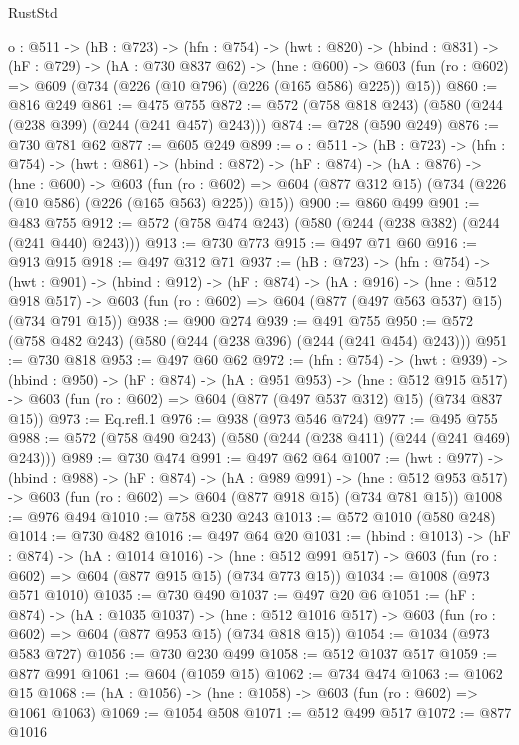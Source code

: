 \begin{lexlean}{RustStd}
\begin{coremodule}
  {o : @511} ->
  (hB : @723) ->
  (hfn : @754) ->
  (hwt : @820) ->
  (hbind : @831) ->
  (hF : @729) ->
  (hA : @730 @837 @62) ->
  (hne : @600) ->
  @603 (fun (ro : @602) => @609 (@734 (@226 (@10 @796) (@226 (@165 @586) @225)) @15))
@860 := @816 @249
@861 := @475 @755
@872 := @572 (@758 @818 @243) (@580 (@244 (@238 @399) (@244 (@241 @457) @243)))
@874 := @728 (@590 @249)
@876 := @730 @781 @62
@877 := @605 @249
@899 := {o : @511} ->
  (hB : @723) ->
  (hfn : @754) ->
  (hwt : @861) ->
  (hbind : @872) ->
  (hF : @874) ->
  (hA : @876) ->
  (hne : @600) ->
  @603
    (fun (ro : @602) => @604 (@877 @312 @15) (@734 (@226 (@10 @586) (@226 (@165 @563) @225)) @15))
@900 := @860 @499
@901 := @483 @755
@912 := @572 (@758 @474 @243) (@580 (@244 (@238 @382) (@244 (@241 @440) @243)))
@913 := @730 @773
@915 := @497 @71 @60
@916 := @913 @915
@918 := @497 @312 @71
@937 := (hB : @723) ->
  (hfn : @754) ->
  (hwt : @901) ->
  (hbind : @912) ->
  (hF : @874) ->
  (hA : @916) ->
  (hne : @512 @918 @517) ->
  @603 (fun (ro : @602) => @604 (@877 (@497 @563 @537) @15) (@734 @791 @15))
@938 := @900 @274
@939 := @491 @755
@950 := @572 (@758 @482 @243) (@580 (@244 (@238 @396) (@244 (@241 @454) @243)))
@951 := @730 @818
@953 := @497 @60 @62
@972 := (hfn : @754) ->
  (hwt : @939) ->
  (hbind : @950) ->
  (hF : @874) ->
  (hA : @951 @953) ->
  (hne : @512 @915 @517) ->
  @603 (fun (ro : @602) => @604 (@877 (@497 @537 @312) @15) (@734 @837 @15))
@973 := Eq.refl.{1}
@976 := @938 (@973 @546 @724)
@977 := @495 @755
@988 := @572 (@758 @490 @243) (@580 (@244 (@238 @411) (@244 (@241 @469) @243)))
@989 := @730 @474
@991 := @497 @62 @64
@1007 := (hwt : @977) ->
  (hbind : @988) ->
  (hF : @874) ->
  (hA : @989 @991) ->
  (hne : @512 @953 @517) -> @603 (fun (ro : @602) => @604 (@877 @918 @15) (@734 @781 @15))
@1008 := @976 @494
@1010 := @758 @230 @243
@1013 := @572 @1010 (@580 @248)
@1014 := @730 @482
@1016 := @497 @64 @20
@1031 := (hbind : @1013) ->
  (hF : @874) ->
  (hA : @1014 @1016) ->
  (hne : @512 @991 @517) -> @603 (fun (ro : @602) => @604 (@877 @915 @15) (@734 @773 @15))
@1034 := @1008 (@973 @571 @1010)
@1035 := @730 @490
@1037 := @497 @20 @6
@1051 := (hF : @874) ->
  (hA : @1035 @1037) ->
  (hne : @512 @1016 @517) -> @603 (fun (ro : @602) => @604 (@877 @953 @15) (@734 @818 @15))
@1054 := @1034 (@973 @583 @727)
@1056 := @730 @230 @499
@1058 := @512 @1037 @517
@1059 := @877 @991
@1061 := @604 (@1059 @15)
@1062 := @734 @474
@1063 := @1062 @15
@1068 := (hA : @1056) -> (hne : @1058) -> @603 (fun (ro : @602) => @1061 @1063)
@1069 := @1054 @508
@1071 := @512 @499 @517
@1072 := @877 @1016

\end{coremodule}
\end{lexlean}
